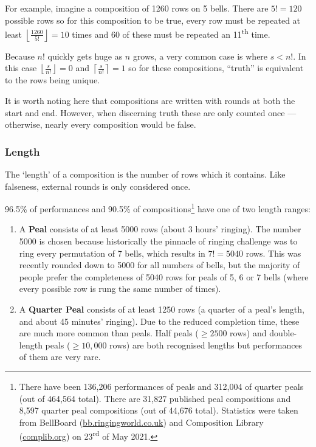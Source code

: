 \documentclass[12pt]{article}
\newcommand{\nth}[2]{#1\textsuperscript{#2}}
\begin{document}
For example, imagine a composition of 1260 rows on 5 bells.  There are $5! = 120$ possible rows so
for this composition to be true, every row must be repeated at least 
$\left\lfloor \frac{1260}{5!} \right\rfloor = 10$ times and 60 of these must
be repeated an \nth{11}{th} time.

Because $n!$ quickly gets huge as $n$ grows, a very common case is where $s < n!$. In this case
$\left\lfloor \frac{s}{n!} \right\rfloor = 0$ and $\left\lceil \frac{s}{n!} \right\rceil = 1$ so
for these compositions, ``truth'' is equivalent to the rows being unique.

It is worth noting here that compositions are written with rounds at both the start and end.
However, when discerning truth these are only counted once --- otherwise, nearly every composition
would be false.

\subsubsection{Length}

The `length' of a composition is the number of rows which it contains.  Like falseness, external
rounds is only considered once.

96.5\% of performances and 90.5\% of compositions\footnote{There have been 136,206 performances of
peals and 312,004 of quarter peals (out of 464,564 total).  There are 31,827 published peal
compositions and 8,597 quarter peal compositions (out of 44,676 total).  Statistics were taken from
BellBoard (\url{bb.ringingworld.co.uk}) and Composition Library (\url{complib.org}) on \nth{23}{rd}
of May 2021.} have one of two length ranges:

\begin{enumerate}
    \item A \textbf{Peal} consists of at least 5000 rows (about 3 hours' ringing).
        The number 5000 is chosen because historically the pinnacle of ringing challenge was to ring
        every permutation of 7 bells, which results in $7! = 5040$ rows.  This was recently rounded
        down to 5000 for all numbers of bells, but the majority of people prefer the completeness of
        5040 rows for peals of 5, 6 or 7 bells (where every possible row is rung the same number of
        times).
    \item A \textbf{Quarter Peal} consists of at least 1250 rows (a quarter of a peal's length, and
        about 45 minutes' ringing).  Due to the reduced completion time, these are much more
        common than peals.  Half peals ($\ge 2500$ rows) and double-length peals ($\ge 10,000$ rows)
        are both recognised lengths but performances of them are very rare.
\end{enumerate}
\end{document}
